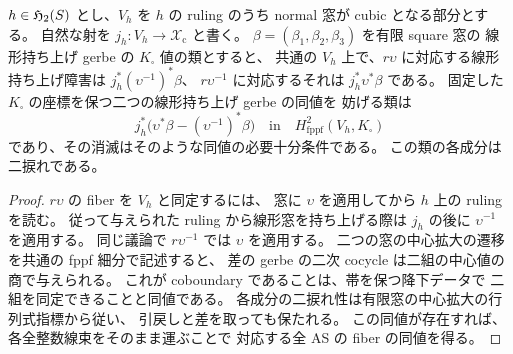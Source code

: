 \begin{corollary}
\label{cor:qa-cubic-lift-obstruction-comparison}
$h\in\mathfrak H_2(S)$ とし、$V_h$ を $h$ の ruling のうち
normal 窓が cubic となる部分とする。
自然な射を $j_h:V_h\to\mathcal X_{\mathrm{c}}$ と書く。
$\beta=(\beta_1,\beta_2,\beta_3)$ を有限 square 窓の
線形持ち上げ gerbe の $K_\square$ 値の類とすると、
共通の $V_h$ 上で、$r\upsilon$ に対応する線形持ち上げ障害は
$j_h^*(\upsilon^{-1})^*\beta$、
$r\upsilon^{-1}$ に対応するそれは $j_h^*\upsilon^*\beta$ である。
固定した $K_\square$ の座標を保つ二つの線形持ち上げ gerbe の同値を
妨げる類は
\[
 j_h^*\bigl(\upsilon^*\beta-(\upsilon^{-1})^*\beta\bigr)
 \quad\text{in}\quad H^2_{\mathrm{fppf}}(V_h,K_\square)
\]
であり、その消滅はそのような同値の必要十分条件である。
この類の各成分は二捩れである。
\end{corollary}
\begin{proof}
$r\upsilon$ の fiber を $V_h$ と同定するには、
窓に $\upsilon$ を適用してから $h$ 上の ruling を読む。
従って与えられた ruling から線形窓を持ち上げる際は
$j_h$ の後に $\upsilon^{-1}$ を適用する。
同じ議論で $r\upsilon^{-1}$ では $\upsilon$ を適用する。
二つの窓の中心拡大の遷移を共通の fppf 細分で記述すると、
差の gerbe の二次 cocycle は二組の中心値の商で与えられる。
これが coboundary であることは、帯を保つ降下データで
二組を同定できることと同値である。
各成分の二捩れ性は有限窓の中心拡大の行列式指標から従い、
引戻しと差を取っても保たれる。
この同値が存在すれば、各全整数線束をそのまま運ぶことで
対応する全 AS の fiber の同値を得る。
\end{proof}

